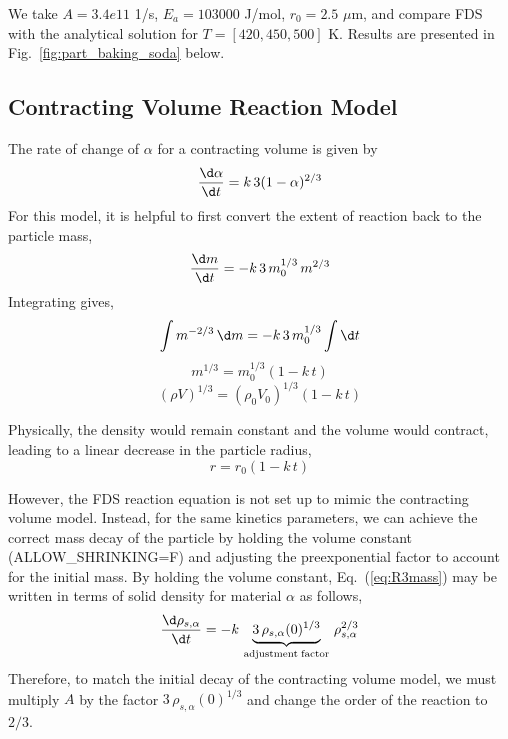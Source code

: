 \documentclass[11pt]{book}
\begin{document}
We take $A = 3.4e11$ 1/s, $E_a = 103000$ J/mol, $r_0 = 2.5$ $\mu$m, and compare FDS with the analytical solution for $T=[420, 450, 500]$ K.  Results are presented in Fig.~\ref{fig:part_baking_soda} below.

\subsection*{Contracting Volume Reaction Model}

The rate of change of $\alpha$ for a contracting volume is given by \cite{Khawam:2006}
\begin{equation}
\frac{\d \alpha}{\d t} = k \, 3(1-\alpha)^{2/3}
\end{equation}
For this model, it is helpful to first convert the extent of reaction back to the particle mass,
\begin{equation}
\label{eq:R3mass}
\frac{\d m}{\d t} = - k \, 3 \, m_0^{1/3} \, m^{2/3}
\end{equation}
Integrating gives,
\begin{equation}
\int m^{-2/3} \,\d m = -k \, 3 \, m_0^{1/3} \int \d t
\end{equation}
\begin{equation}
m^{1/3} = m_0^{1/3} (1-k \, t)
\end{equation}
\begin{equation}
(\rho V)^{1/3} = (\rho_0 V_0)^{1/3} (1-k \, t)
\end{equation}

Physically, the density would remain constant and the volume would contract, leading to a linear decrease in the particle radius,
\begin{equation}
r = r_0 (1-k \, t)
\end{equation}

However, the FDS reaction equation is not set up to mimic the contracting volume model.  Instead, for the same kinetics parameters, we can achieve the correct mass decay of the particle by holding the volume constant ({\ct ALLOW\_SHRINKING=F}) and adjusting the preexponential factor to account for the initial mass.  By holding the volume constant, Eq.~(\ref{eq:R3mass}) may be written in terms of solid density for material $\alpha$ as follows,
\begin{equation}
\label{eq:R3rho}
\frac{\d \rho_{s,\alpha}}{\d t} = - k \, \underbrace{3 \, \rho_{s,\alpha}(0)^{1/3}}_{\mathrm{adjustment \; factor}} \, \rho_{s,\alpha}^{2/3}
\end{equation}
Therefore, to match the initial decay of the contracting volume model, we must multiply $A$ by the factor $3 \, \rho_{s,\alpha}(0)^{1/3}$ and change the order of the reaction to $2/3$.
\end{document}
